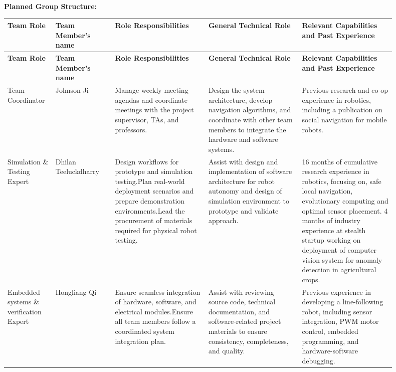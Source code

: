 \documentclass[12pt,a4paper]{article}
\begin{document}
\par\medskip\noindent\textbf{Planned Group Structure:}\par\smallskip
\begin{landscape}
\begin{longtable}{|p{0.10\linewidth}|p{0.14\linewidth}|p{0.22\linewidth}|p{0.22\linewidth}|p{0.22\linewidth}|}
\hline
\textbf{Team Role} & \textbf{Team Member’s name} & \textbf{Role Responsibilities} & \textbf{General Technical Role} & \textbf{Relevant Capabilities and Past Experience} \\ \hline
\endfirsthead
\hline
\textbf{Team Role} & \textbf{Team Member’s name} & \textbf{Role Responsibilities} & \textbf{General Technical Role} & \textbf{Relevant Capabilities and Past Experience} \\ \hline
\endhead
Team Coordinator & Johnson Ji & Manage weekly meeting agendas and coordinate meetings with the project supervisor, TAs, and professors. & Design the system architecture, develop navigation algorithms, and coordinate with other team members to integrate the hardware and software systems. & Previous research and co-op experience in robotics, including a publication on social navigation for mobile robots. \\ \hline
Simulation \& Testing Expert & Dhilan Teeluckdharry & Design workflows for prototype and simulation testing.Plan real-world deployment scenarios and prepare demonstration environments.Lead the procurement of materials required for physical robot testing. & Assist with design and implementation of software architecture for robot autonomy and design of simulation environment to prototype and validate approach. & 16 months of cumulative research experience in robotics, focusing on, safe local navigation, evolutionary computing and optimal sensor placement. 4 months of industry experience at stealth startup working on deployment of computer vision system for anomaly detection in agricultural crops. \\ \hline
Embedded systems \& verification Expert & Hongliang Qi & Ensure seamless integration of hardware, software, and electrical modules.Ensure all team members follow a coordinated system integration plan. & Assist with reviewing source code, technical documentation, and software-related project materials to ensure consistency, completeness, and quality. & Previous experience in developing a line-following robot, including sensor integration, PWM motor control, embedded programming, and hardware-software debugging. \\ \hline

\end{longtable}
\end{landscape}
\end{document}
